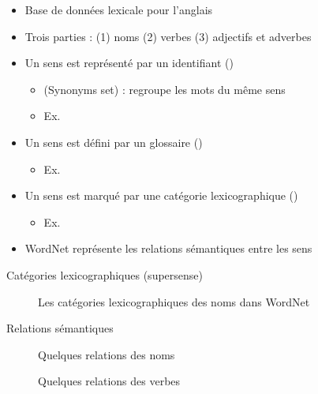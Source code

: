 \documentclass{KodeBook}
\begin{document}
\begin{itemize}
	\item Base de données lexicale pour l'anglais \cite{1995-miller}
	\item Trois parties : (1) noms (2) verbes (3) adjectifs et adverbes
	\item Un sens est représenté par un identifiant ()
	\begin{itemize}
		\item {} (Synonyms set) : regroupe les mots du même sens 
		\item Ex. 
	\end{itemize}
	\item Un sens est défini par un glossaire ()
	\begin{itemize}
		\item Ex. 
	\end{itemize}
	\item Un sens est marqué par une catégorie lexicographique ()
	\begin{itemize}
		\item Ex. 
	\end{itemize}
	\item WordNet représente les relations sémantiques entre les sens
\end{itemize}

Catégories lexicographiques (supersense)
\begin{figure}
	\caption{Les catégories lexicographiques des noms dans WordNet \cite{2019-jurafsky-martin}}
\end{figure}

Relations sémantiques
\begin{figure}
	\vspace{-9pt}
	\caption{Quelques relations des noms \cite{2019-jurafsky-martin}}
\end{figure}\vspace{-6pt}

\begin{figure}
	\vspace{-9pt}
	\caption{Quelques relations des verbes \cite{2019-jurafsky-martin}}
\end{figure}
\end{document}
